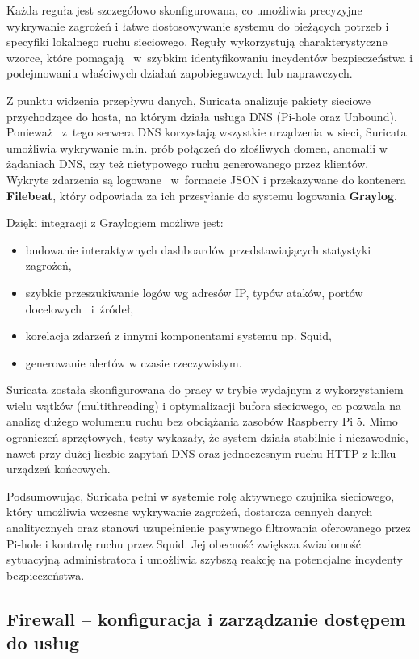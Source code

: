 \documentclass[
    left=2.5cm,         %
    right=2.5cm,        %
    top=2.5cm,          %
    bottom=3cm,         %
    bindingoffset=6mm,  %
    nohyphenation=true %
]{eiti/eiti-thesis} %
\begin{document}
Każda reguła jest szczegółowo skonfigurowana, co umożliwia precyzyjne wykrywanie zagrożeń i łatwe dostosowywanie systemu do bieżących potrzeb i specyfiki lokalnego ruchu sieciowego. Reguły wykorzystują charakterystyczne wzorce, które pomagają ~w~szybkim identyfikowaniu incydentów bezpieczeństwa i podejmowaniu właściwych działań zapobiegawczych lub naprawczych. 

Z punktu widzenia przepływu danych, Suricata analizuje pakiety sieciowe przychodzące do hosta, na którym działa usługa DNS (Pi-hole oraz Unbound). Ponieważ ~z~tego serwera DNS korzystają wszystkie urządzenia w sieci, Suricata umożliwia wykrywanie m.in. prób połączeń do złośliwych domen, anomalii w żądaniach DNS, czy też nietypowego ruchu generowanego przez klientów. Wykryte zdarzenia są logowane ~w~formacie JSON i przekazywane do kontenera \textbf{Filebeat}, który odpowiada 
za ich przesyłanie do systemu logowania \textbf{Graylog}.


Dzięki integracji z Graylogiem możliwe jest:
\begin{itemize}
    \item budowanie interaktywnych dashboardów przedstawiających statystyki zagrożeń,
    \item szybkie przeszukiwanie logów wg adresów IP, typów ataków, portów docelowych ~i~źródeł,
    \item korelacja zdarzeń z innymi komponentami systemu np. Squid,
    \item generowanie alertów w czasie rzeczywistym.
\end{itemize}

Suricata została skonfigurowana do pracy w trybie wydajnym z wykorzystaniem wielu wątków (multithreading) i optymalizacji bufora sieciowego, co pozwala na analizę dużego wolumenu ruchu bez obciążania zasobów Raspberry Pi 5. Mimo ograniczeń sprzętowych, testy wykazały, że system działa stabilnie i niezawodnie, nawet przy dużej liczbie zapytań DNS oraz jednoczesnym ruchu HTTP z kilku urządzeń końcowych.

Podsumowując, Suricata pełni w systemie rolę aktywnego czujnika sieciowego, który umożliwia wczesne wykrywanie zagrożeń, dostarcza cennych danych analitycznych 
oraz stanowi uzupełnienie pasywnego filtrowania oferowanego przez Pi-hole i kontrolę ruchu przez Squid. Jej obecność zwiększa świadomość sytuacyjną administratora 
i umożliwia szybszą reakcję na potencjalne incydenty bezpieczeństwa.

\subsection{Firewall – konfiguracja i zarządzanie dostępem do usług}
\end{document}
